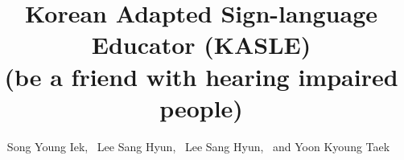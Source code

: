 \documentclass[10pt,journal,compsoc]{IEEEtran}
\begin{document}
\title{Korean Adapted Sign-language Educator (KASLE)\\  (be a friend with hearing impaired people)}

%
%
%
%

\author{Song Young Iek,~\IEEEmembership{}
        Lee Sang Hyun,~\IEEEmembership{}
	Lee Sang Hyun,~\IEEEmembership{}
        and Yoon Kyoung Taek~\IEEEmembership{}}%
\end{document}
